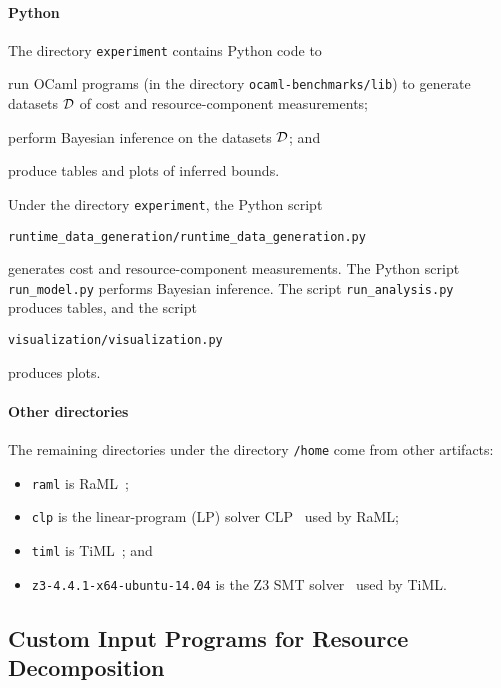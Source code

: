 \paragraph{Python}

The directory \texttt{experiment} contains Python code to
\begin{enumerate*}[label=(\roman*)]
  \item run OCaml programs (in the directory \texttt{ocaml-benchmarks/lib})
        to generate datasets $\mathcal{D}$ of cost and resource-component measurements;
  \item perform Bayesian inference on the datasets $\mathcal{D}$; and
  \item produce tables and plots of inferred bounds.
\end{enumerate*}
%
Under the directory \texttt{experiment}, the Python script
\begin{verbatim}
runtime_data_generation/runtime_data_generation.py
\end{verbatim}
generates cost and resource-component measurements.
%
The Python script \texttt{run\_model.py} performs Bayesian inference.
%
The script \texttt{run\_analysis.py} produces tables, and the script
\begin{verbatim}
visualization/visualization.py
\end{verbatim}
produces plots.

\paragraph{Other directories}

The remaining directories under the directory \texttt{/home} come from other
artifacts:
\begin{itemize}
  \item \texttt{raml} is RaML~\citep{Hoffmann2017,RaML};
  \item \texttt{clp} is the linear-program (LP) solver CLP~\citep{CLP} used by
        RaML;
  \item \texttt{timl} is TiML~\citep{WangWC17}; and
  \item \texttt{z3-4.4.1-x64-ubuntu-14.04} is the Z3 SMT
        solver~\citep{DeMoura2008} used by TiML.
\end{itemize}

\subsection{Custom Input Programs for Resource Decomposition}

